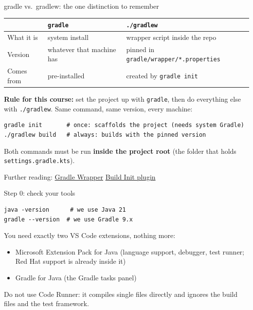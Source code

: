 \documentclass[11pt,aspectratio=169]{beamer}
\begin{document}
\begin{frame}[fragile]{gradle vs.\ gradlew: the one distinction to remember}
  \begin{center}
  {\scriptsize
  \begin{tabular}{l|l|l}
    & \texttt{gradle} & \texttt{./gradlew} \\ \hline
    What it is & system install & wrapper script inside the repo \\
    Version & whatever that machine has & pinned in
      \texttt{gradle/wrapper/*.properties} \\
    Comes from & pre-installed & created by \texttt{gradle init} \\
  \end{tabular}
  }
  \end{center}
  \vspace{0.5em}
  \textbf{Rule for this course:} set the project up with \texttt{gradle},
  then do everything else with \texttt{./gradlew}. Same command, same
  version, every machine:
  \begin{lstlisting}
gradle init       # once: scaffolds the project (needs system Gradle)
./gradlew build   # always: builds with the pinned version
  \end{lstlisting}
  Both commands must be run \textbf{inside the project root} (the folder
  that holds \texttt{settings.gradle.kts}).

  \vspace{0.3em}
  {\scriptsize Further reading: \href{https://docs.gradle.org/current/userguide/gradle_wrapper.html}{Gradle Wrapper}
  \textbar{} \href{https://docs.gradle.org/current/userguide/build_init_plugin.html}{Build Init plugin}}
\end{frame}

\begin{frame}[fragile]{Step 0: check your tools}
  \begin{lstlisting}
java -version      # we use Java 21
gradle --version  # we use Gradle 9.x
  \end{lstlisting}
  You need exactly two VS Code extensions, nothing more:
  \begin{itemize}
    \item Microsoft Extension Pack for Java (language support, debugger,
      test runner; Red Hat support is already inside it)
    \item Gradle for Java (the Gradle tasks panel)
  \end{itemize}
  Do not use Code Runner: it compiles single files directly and ignores
  the build files and the test framework.
\end{frame}
\end{document}
